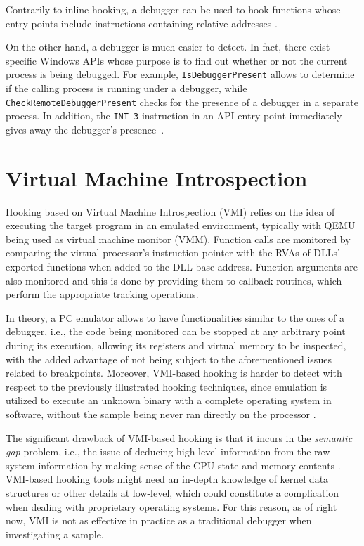Contrarily to inline hooking, a debugger can be used to hook functions whose entry points include instructions containing relative addresses \cite{Berdajs:2010:EAU:1815744.1815746}.

On the other hand, a debugger is much easier to detect. In fact, there exist specific Windows APIs whose purpose is to find out whether or not the current process is being debugged. For example, \texttt{IsDebuggerPresent} allows to determine if the calling process is running under a debugger, while \texttt{CheckRemoteDebuggerPresent} checks for the presence of a debugger in a separate process. 
In addition, the \texttt{INT 3} instruction in an API entry point immediately gives away the debugger's presence~\cite{HookingDetection}.



\section{Virtual Machine Introspection}

Hooking based on Virtual Machine Introspection (VMI) relies on the idea of executing the target program in an emulated environment, typically with QEMU being used as virtual machine monitor (VMM). Function calls are monitored by comparing the virtual processor's instruction pointer with the RVAs of DLLs' exported functions when added to the DLL base address. Function arguments are also monitored and this is done by providing them to callback routines, which perform the appropriate tracking operations.

In theory, a PC emulator allows to have functionalities similar to the ones of a debugger, i.e., the code being monitored can be stopped at any arbitrary point during its execution, allowing its registers and virtual memory to be inspected, with the added advantage of not being subject to the aforementioned issues related to breakpoints.
Moreover, VMI-based hooking is harder to detect with respect to the previously illustrated hooking techniques, since emulation is utilized to execute an unknown binary with a complete operating system in software, without the sample being never ran directly on the processor \cite{Bayer2005TTAnalyzeA}.

The significant drawback of VMI-based hooking is that it incurs in the \textit{semantic gap} problem, i.e., the issue of deducing high-level information from the raw system information by making sense of the CPU state and memory contents \cite{Egele:2008:SAD:2089125.2089126}. VMI-based hooking tools
might need an in-depth knowledge of kernel data structures or other details at low-level, which could constitute a complication when dealing with proprietary operating systems. For this reason, as of right now, VMI is not as effective in practice as a traditional debugger when investigating a sample.


